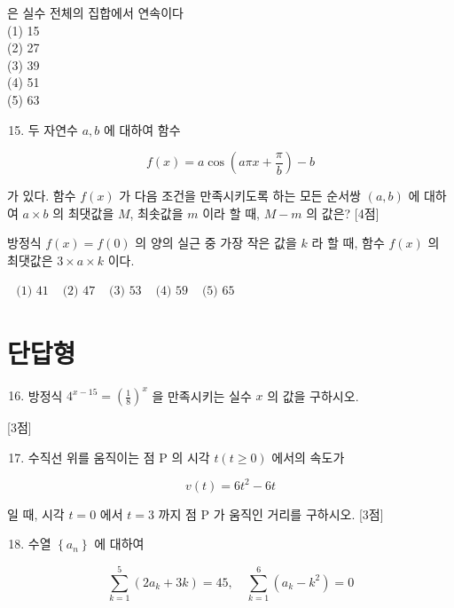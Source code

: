 \documentclass[10pt]{article}
\begin{document}
은 실수 전체의 집합에서 연속이다\\
(1) 15\\
(2) 27\\
(3) 39\\
(4) 51\\
(5) 63

\begin{enumerate}
  \setcounter{enumi}{14}
  \item 두 자연수 \(a, b\) 에 대하여 함수
\end{enumerate}

\[
f(x)=a \cos \left(a \pi x+\frac{\pi}{b}\right)-b
\]

가 있다. 함수 \(f(x)\) 가 다음 조건을 만족시키도록 하는 모든 순서쌍 \((a, b)\) 에 대하여 \(a \times b\) 의 최댓값을 \(M\), 최솟값을 \(m\) 이라 할 때, \(M-m\) 의 값은? [4점]

방정식 \(f(x)=f(0)\) 의 양의 실근 중 가장 작은 값을 \(k\) 라 할 때, 함수 \(f(x)\) 의 최댓값은 \(3 \times a \times k\) 이다.

\(\begin{array}{lllll}\text { (1) } 41 & \text { (2) } 47 & \text { (3) } 53 & \text { (4) } 59 & \text { (5) } 65\end{array}\)

\section*{단답형}
\begin{enumerate}
  \setcounter{enumi}{15}
  \item 방정식 \(4^{x-15}=\left(\frac{1}{8}\right)^{x}\) 을 만족시키는 실수 \(x\) 의 값을 구하시오.
\end{enumerate}

[3점]

\begin{enumerate}
  \setcounter{enumi}{16}
  \item 수직선 위를 움직이는 점 P 의 시각 \(t(t \geq 0)\) 에서의 속도가
\end{enumerate}

\[
v(t)=6 t^{2}-6 t
\]

일 때, 시각 \(t=0\) 에서 \(t=3\) 까지 점 P 가 움직인 거리를 구하시오. [3점]

\begin{enumerate}
  \setcounter{enumi}{17}
  \item 수열 \(\left\{a_{n}\right\}\) 에 대하여
\end{enumerate}

\[
\sum_{k=1}^{5}\left(2 a_{k}+3 k\right)=45, \quad \sum_{k=1}^{6}\left(a_{k}-k^{2}\right)=0
\]
\end{document}
